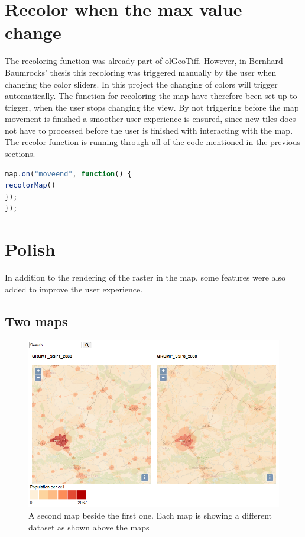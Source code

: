\section{Recolor when the max value change}\label{RecolorOnChange}

The recoloring function was already part of olGeoTiff. However, in Bernhard Baumrocks’ thesis this recoloring was triggered manually by the user when changing the color sliders. In this project the changing of colors will trigger automatically. The function for recoloring the map have therefore been set up to trigger, when the user stops changing the view. By not triggering before the map movement is finished a smoother user experience is ensured, since new tiles does not have to processed before the user is finished with interacting with the map. The recolor function is running through all of the code mentioned in the previous sections. 

\begin{lstlisting}[language=JavaScript, caption={The JavaScript in the project}, label= VoresJS,escapechar=|]
map.on("moveend", function() {
recolorMap()
});
});
\end{lstlisting}
\section{Polish}\label{Polish}
In addition to the rendering of the raster in the map, some features were also added to improve the user experience.

\subsection{Two maps}\label{DTTwoMaps}

\begin{figure} [H]
	\centering
	\includegraphics[width=.8\textwidth]{Pictures/Frontpage}
	\caption{A second map beside the first one. Each map is showing a different dataset as shown above the maps}
	\label{DualMaps}
\end{figure}

